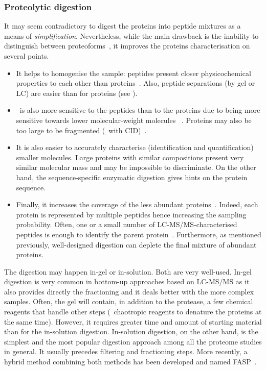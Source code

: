 \subsubsection{Proteolytic digestion}
It may seem contradictory to digest the proteins into peptide mixtures as a means
of \emph{simplification}. Nevertheless, while the main drawback is the inability
to distinguish between proteoforms~, it improves the proteins
characterisation on several points.
\begin{itemize}
    \item It helps to homogenise the sample: peptides present closer
        physicochemical properties to each other than proteins~.
        Also, peptide separations (by gel or \gls{LC}) are easier than
        for proteins (see ).
    \item \ms\ is also more sensitive to the peptides than to the proteins
        due to being more sensitive towards lower molecular-weight molecules~%
        . Proteins may also be too large to be
        fragmented (\eg\ with \gls{CID})~.
    \item It is also easier to accurately characterise (identification and
        quantification) smaller molecules. Large proteins with similar
        compositions present very similar molecular mass and may be impossible
        to discriminate. On the other hand, the sequence-specific enzymatic
        digestion gives hints on the protein sequence.
    \item Finally, it increases the coverage of the less abundant proteins~.
        Indeed, each protein is represented by multiple
        peptides hence increasing the sampling probability. Often, one or a small
        number of \gls{LC-MS/MS}-characterised peptides is enough to identify the
        parent protein~.
        Furthermore, as mentioned previously, well-designed digestion can deplete
        the final mixture of abundant proteins.
\end{itemize}

The digestion may happen in-gel or in-solution. Both are very well-used.
In-gel digestion is very common in bottom-up approaches based on \gls{LC-MS/MS}
as it also provides directly the fractioning and it deals better with the more
complex samples. Often, the gel will contain, in addition to the protease, a few
chemical reagents that handle other steps (\eg\ chaotropic reagents to denature
the proteins at the same time). However, it requires greater time and amount of
starting material than for the in-solution digestion. In-solution digestion,
on the other hand, is the simplest and the most popular
digestion approach among all the proteome studies in general. It usually
precedes filtering and fractioning steps. More recently, a hybrid method
combining both methods has been developed and
named \acrfull{FASP}~.

